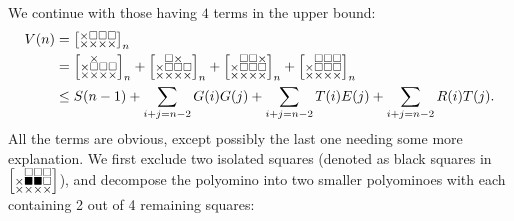 \documentclass[a4paper,12pt]{article}
\makeatletter
\newenvironment{grid}
  {\begingroup\footnotesize
   \renewcommand{\arraystretch}{0}
   \setlength{\arraycolsep}{0pt}
   \left[\begin{array}{@{}*{10}{c}@{}}}
  {\end{array}\right]\endgroup}
\newcommand{\void}{\phantom{\times}}
\newcommand{\myV}{
    \begin{grid}
        \times & \square & \square & \square \\
        \times & \times & \times & \times
    \end{grid}
}
\makeatother
\begin{document}
	We continue with those having $4$ terms in the upper bound:
	\begin{align*}
		V(n) &= \myV_n \\
		    &=\begin{grid}
			\void & \times & \void & \void \\
			\times & \square & \square & \square \\
			\times & \times & \times & \times
		    \end{grid}_n + \begin{grid}
			\void & \square & \times & \void \\
			\times & \square & \square & \square \\
			\times & \times & \times & \times
		    \end{grid}_n + \begin{grid}
			\void & \square & \square & \times \\
			\times & \square & \square & \square \\
			\times & \times & \times & \times
		    \end{grid}_n + \begin{grid}
			\void & \square & \square & \square \\
			\times & \square & \square & \square \\
			\times & \times & \times & \times
		    \end{grid}_n \\
		    &\le S(n-1)
		      + \sum_{i+j=n-2} G(i)G(j)
		      + \sum_{i+j=n-2} T(i)E(j)
		      + \sum_{i+j=n-2} R(i)T(j).
	\end{align*}
	All the terms are obvious, except possibly the last one needing some more explanation. We first exclude two isolated squares (denoted as black squares in $\begin{grid}
			\void & \square & \square & \square \\
			\times & \blacksquare & \blacksquare & \square \\
			\times & \times & \times & \times
		    \end{grid}$), and decompose the polyomino into two smaller polyominoes with each containing 2 out of 4 remaining squares:
\end{document}
